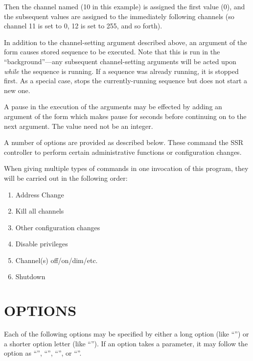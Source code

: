 Then the channel named (10 in this example) is assigned the first value
(0), and the subsequent values are assigned to the immediately following
channels (so channel 11 is set to 0, 12 is set to 255, and so forth).


In addition to the channel-setting argument described above,
an argument of the form
causes stored sequence 
to be executed.  Note that this is run in the ``background''---any
subsequent channel-setting arguments will be acted upon 
\emph{while}
the sequence is running.  If a sequence was already running, it is stopped first.
As a special case, 
stops the currently-running sequence but does not start a new one.


A pause in the execution of the arguments may be effected by adding an
argument of the form 
which makes
pause for
seconds before continuing on to the next argument.  The
value need not be an integer.


A number of options are provided as described below.  These command
the SSR controller to perform certain administrative functions or 
configuration changes.


When giving multiple types of commands in one invocation of this
program, they will be carried out in the following order:
\begin{enumerate}
\item
Address Change
\item
Kill all channels
\item
Other configuration changes
\item
Disable privileges
\item
Channel(s) off/on/dim/etc.
\item
Shutdown
\end{enumerate}
\section*{OPTIONS}


Each of the following options may be specified by either a long
option (like
``'')
or a shorter option letter (like
``'').
If an option takes a parameter, it may follow the option as
``'',
``'',
``'',
or
``''.


